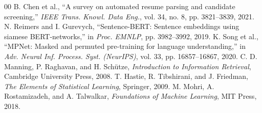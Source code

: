 \documentclass[conference]{IEEEtran}
\begin{document}
\begin{thebibliography}{00}
 B. Chen et al., ``A survey on automated resume parsing and candidate screening,'' \textit{IEEE Trans. Knowl. Data Eng.}, vol. 34, no. 8, pp. 3821--3839, 2021.
 N. Reimers and I. Gurevych, ``Sentence-BERT: Sentence embeddings using siamese BERT-networks,'' in \textit{Proc. EMNLP}, pp. 3982--3992, 2019.
 K. Song et al., ``MPNet: Masked and permuted pre-training for language understanding,'' in \textit{Adv. Neural Inf. Process. Syst. (NeurIPS)}, vol. 33, pp. 16857--16867, 2020.
 C. D. Manning, P. Raghavan, and H. Schütze, \textit{Introduction to Information Retrieval}, Cambridge University Press, 2008.
 T. Hastie, R. Tibshirani, and J. Friedman, \textit{The Elements of Statistical Learning}, Springer, 2009.
 M. Mohri, A. Rostamizadeh, and A. Talwalkar, \textit{Foundations of Machine Learning}, MIT Press, 2018.
\end{thebibliography}
\end{document}
